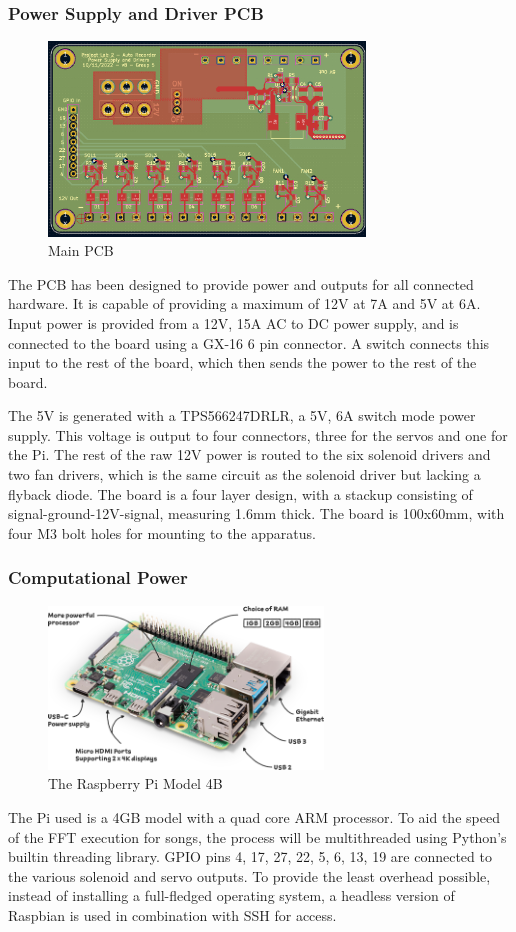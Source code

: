 \documentclass[UTF8, 12pt]{article}
\begin{document}
    \subsubsection{Power Supply and Driver PCB}
    \begin{figure}[h]
        \centering
        \includegraphics[width=0.75\textwidth]{pcb.png}
        \caption{Main PCB}
    \end{figure}
    The PCB has been designed to provide power and outputs for all connected hardware. It is capable of providing a maximum of 12V at 7A and 5V at 6A. Input power is provided from a 12V, 15A AC to DC power supply, and is connected to the board using a GX-16 6 pin connector. A switch connects this input to the rest of the board, which then sends the power to the rest of the board.

    The 5V is generated with a TPS566247DRLR, a 5V, 6A switch mode power supply. This voltage is output to four connectors, three for the servos and one for the Pi. The rest of the raw 12V power is routed to the six solenoid drivers and two fan drivers, which is the same circuit as the solenoid driver but lacking a flyback diode. The board is a four layer design, with a stackup consisting of signal-ground-12V-signal, measuring 1.6mm thick. The board is 100x60mm, with four M3 bolt holes for mounting to the apparatus. 
    \subsubsection{Computational Power}
    \begin{figure}[h]
        \centering
        \includegraphics[width=0.65\textwidth]{rpi.png}
        \caption{The Raspberry Pi Model 4B}
    \end{figure}
    The Pi used is a 4GB model with a quad core ARM processor. To aid the speed of the FFT execution for songs, the process will be multithreaded using Python's builtin threading library. GPIO pins 4, 17, 27, 22, 5, 6, 13, 19 are connected to the various solenoid and servo outputs. To provide the least overhead possible, instead of installing a full-fledged operating system, a headless version of Raspbian is used in combination with SSH for access.
\end{document}
